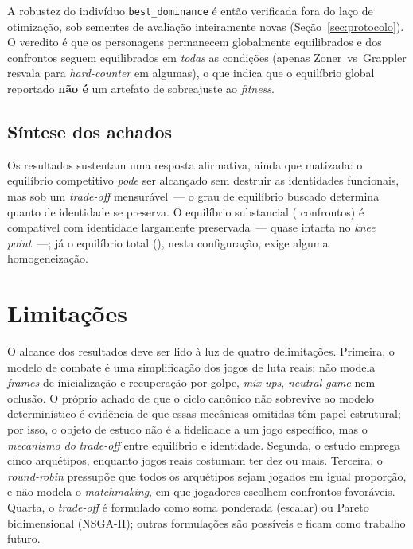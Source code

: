\documentclass[12pt]{article}
\begin{document}
A robustez do indivíduo \texttt{best\_dominance} é então verificada fora do laço de
otimização, sob \extNSeeds{} sementes de avaliação inteiramente novas
(Seção~\ref{sec:protocolo}). O veredito é que os \robCharsBd{} personagens permanecem
globalmente equilibrados e \robBd{} dos \robTotal{} confrontos seguem equilibrados em
\emph{todas} as condições (apenas Zoner~vs~Grappler resvala para \emph{hard-counter}
em algumas), o que indica que o equilíbrio global reportado \textbf{não é} um artefato
de sobreajuste ao \emph{fitness}.

\subsection{Síntese dos achados}

Os resultados sustentam uma resposta afirmativa, ainda que matizada: o equilíbrio
competitivo \emph{pode} ser alcançado sem destruir as identidades funcionais, mas
sob um \emph{trade-off} mensurável~--- o grau de equilíbrio buscado determina
quanto de identidade se preserva. O equilíbrio substancial (\eqBd{} confrontos) é
compatível com identidade largamente preservada~--- quase intacta no \emph{knee
point}~---; já o equilíbrio total (\eqAg{}), nesta configuração, exige alguma
homogeneização.

\section{Limitações}

O alcance dos resultados deve ser lido à luz de quatro delimitações. Primeira, o
modelo de combate é uma simplificação dos jogos de luta reais: não modela
\emph{frames} de inicialização e recuperação por golpe, \emph{mix-ups},
\emph{neutral game} nem oclusão. O próprio achado de que o ciclo canônico não
sobrevive ao modelo determinístico é evidência de que essas mecânicas omitidas têm
papel estrutural; por isso, o objeto de estudo não é a fidelidade a um jogo
específico, mas o \emph{mecanismo do} \emph{trade-off} entre equilíbrio e
identidade. Segunda, o estudo emprega cinco arquétipos, enquanto jogos
reais costumam ter dez ou mais. Terceira, o \emph{round-robin} pressupõe que todos
os arquétipos sejam jogados em igual proporção, e não modela o \emph{matchmaking},
em que jogadores escolhem confrontos favoráveis. Quarta, o \emph{trade-off} é
formulado como soma ponderada (escalar) ou Pareto bidimensional (NSGA-II); outras
formulações são possíveis e ficam como trabalho futuro.
\end{document}
